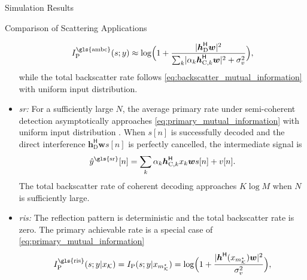 \documentclass[journal]{IEEEtran}
\begin{document}
\begin{section}{Simulation Results}
\begin{subsection}{Comparison of Scattering Applications}
\begin{itemize}
			\begin{equation}
				I_{\text{P}}^{\text{\gls{ambc}}}(s;y) \approx \log \Bigl(1 + \frac{\lvert\boldsymbol{h}_{\text{D}}^\mathsf{H}\boldsymbol{w}\rvert^2}{\sum_{k}\lvert \alpha_k \boldsymbol{h}_{\text{C},k}^\mathsf{H} \boldsymbol{w}\rvert^2+\sigma_v^2}\Bigr),
			\end{equation}
			while the total backscatter rate follows \eqref{eq:backscatter_mutual_information} with uniform input distribution.
			\item \emph{\gls{sr}:} For a sufficiently large $N$, the average primary rate under semi-coherent detection asymptotically approaches \eqref{eq:primary_mutual_information} with uniform input distribution \cite{Long2020a}.
			When $s[n]$ is successfully decoded and the direct interference $\boldsymbol{h}_{\text{D}}^\mathsf{H} \boldsymbol{w} s[n]$ is perfectly cancelled, the intermediate signal is
			\begin{equation}
				\hat{y}^{\text{\gls{sr}}}[n] = \sum_{k} \alpha_k \boldsymbol{h}_{\text{C},k}^\mathsf{H} x_k \boldsymbol{w} s[n] + v[n].
				\label{eq:intermediate_signal}
			\end{equation}
			The total backscatter rate of coherent decoding approaches $K \log M$ when $N$ is sufficiently large.
			\item \emph{\gls{ris}:} The reflection pattern is deterministic and the total backscatter rate is zero.
			The primary achievable rate is a special case of \eqref{eq:primary_mutual_information}
			\begin{equation}
				I_{\text{P}}^{\text{\gls{ris}}}(s;y|x_{\mathcal{K}}) = I_{\text{P}}(s;y|x_{m_{\mathcal{K}}^{\star}}) = \log \Bigl(1 + \frac{\lvert \boldsymbol{h}^\mathsf{H}(x_{m_{\mathcal{K}}^{\star}}) \boldsymbol{w} \rvert^2}{\sigma_v^2}\Bigr),

\end{equation}
\end{itemize}
\end{subsection}
\end{section}
\end{document}
